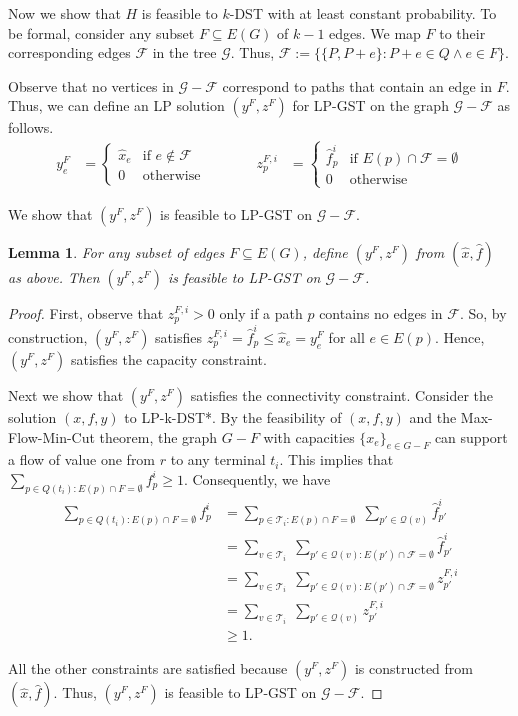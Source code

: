 \documentclass[11pt]{article}
\newtheorem{lemma}[theorem]{Lemma}
\theoremstyle{definition}
\theoremstyle{remark}
\newcommand{\calG}{\mathcal{G}}
\newcommand{\calF}{\mathcal{F}}
\newcommand{\calT}{\mathcal{T}}
\newcommand{\calQ}{\mathcal{Q}}
\renewcommand{\setminus}{-}
\begin{document}
Now we show that $H$ is feasible to $k$-DST 
with at least constant probability.
To be formal, consider any subset $F\subseteq E(G)$ of $k-1$ edges.
We map $F$ to their corresponding edges $\calF$ in the tree $\calG$.
Thus, $\calF := \{\{P,P+e\}: P+e\in Q \land e\in F\}$.

Observe that no vertices in $\calG\setminus\calF$ correspond
to paths that contain an edge in $F$.
Thus, we can define an LP solution $(y^F,z^F)$ for LP-GST
on the graph $\calG \setminus \calF$ as follows.
\[
\begin{array}{rlcrl}
y^F_e &= \left\{\begin{array}{ll}
           \hat{x}_e & \mbox{if $e\not\in\calF$}\\
           0    & \mbox{otherwise}
        \end{array}\right.
& \qquad &
z^{F,i}_p &= \left\{\begin{array}{ll}
           \hat{f}^i_p & \mbox{if $E(p)\cap\calF=\emptyset$}\\
           0    & \mbox{otherwise}
        \end{array}\right.
\end{array}
\]

We show that $(y^F,z^F)$ is feasible to LP-GST on $\calG\setminus\calF$.
\begin{lemma}
\label{lem:feasibility-of-calG-minus-F}
For any subset of edges $F\subseteq E(G)$, 
define $(y^F,z^F)$ from $(\hat{x},\hat{f})$ as above. 
Then $(y^F,z^F)$ is feasible to LP-GST on $\calG\setminus\calF$.
\end{lemma}

\begin{proof}
First, observe that $z^{F,i}_p>0$ only if a path $p$ contains no edges in $\calF$.
So, by construction, $(y^F,z^F)$ satisfies
$z^{F,i}_p = \hat{f}^i_p \leq \hat{x}_e = y^F_e$
for all $e\in E(p)$.
Hence, $(y^F,z^F)$ satisfies the capacity constraint.

Next we show that $(y^F,z^F)$ satisfies the connectivity constraint.
Consider the solution $(x,f,y)$ to LP-k-DST*.
By the feasibility of $(x,f,y)$ and the Max-Flow-Min-Cut theorem, 
the graph $G\setminus F$ with capacities $\{x_e\}_{e\in G\setminus F}$
can support a flow of value one from $r$ to any terminal $t_i$. 
This implies that
$\sum_{p\in Q(t_i):E(p)\cap F=\emptyset}f^i_p \geq 1$.
Consequently, we have 
\[
\begin{array}{rll}
\sum_{p\in Q(t_i):E(p)\cap F=\emptyset}f^i_p 
&= \sum_{p\in \calT_i:E(p)\cap F=\emptyset}\;\sum_{p'\in \calQ(v)}\hat{f}^i_{p'}\\
&= \sum_{v\in \calT_i}\;\sum_{p'\in \calQ(v):E(p')\cap \calF=\emptyset}\hat{f}^i_{p'}\\
&= \sum_{v\in \calT_i}\;\sum_{p'\in \calQ(v):E(p')\cap \calF=\emptyset}z^{F,i}_{p'}\\
&= \sum_{v\in \calT_i}\;\sum_{p'\in \calQ(v)}z^{F,i}_{p'}\\
&\geq 1.
\end{array}
\]

All the other constraints are satisfied 
because $(y^F,z^F)$ is constructed from $(\hat{x},\hat{f})$.
Thus, $(y^F,z^F)$ is feasible to LP-GST on $\calG \setminus \calF$.
\end{proof}
\end{document}

